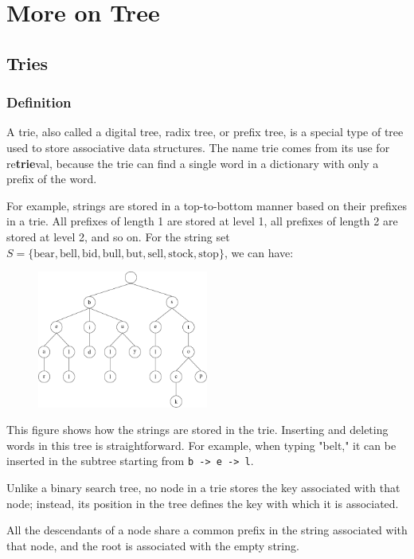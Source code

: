 \chapter{More on Tree}

\section{Tries}
\subsection{Definition}
A trie, also called a digital tree, radix tree, or prefix tree, is a special type of tree used to store associative data structures. The name trie comes from its use for re\textbf{trie}val, because the trie can find a single word in a dictionary with only a prefix of the word. 

For example, strings are stored in a top-to-bottom manner based on their prefixes in a trie. All prefixes of length 1 are stored at level 1, all prefixes of length 2 are stored at level 2, and so on. For the string set \( S = \{ \text{bear}, \text{bell}, \text{bid}, \text{bull}, \text{but}, \text{sell}, \text{stock}, \text{stop} \} \), we can have:
\begin{figure}[H]
  \centering
  \includegraphics[width=0.5\textwidth]{Figure/Tries.pdf}  
\end{figure}
This figure shows how the strings are stored in the trie. Inserting and deleting words in this tree is straightforward. For example, when typing "belt," it can be inserted in the subtree starting from \verb|b -> e -> l|.

Unlike a binary search tree, no node in a trie stores the key associated with that node; instead, its position in the tree defines the key with which it is associated. 

All the descendants of a node share a common prefix in the string associated with that node, and the root is associated with the empty string.

